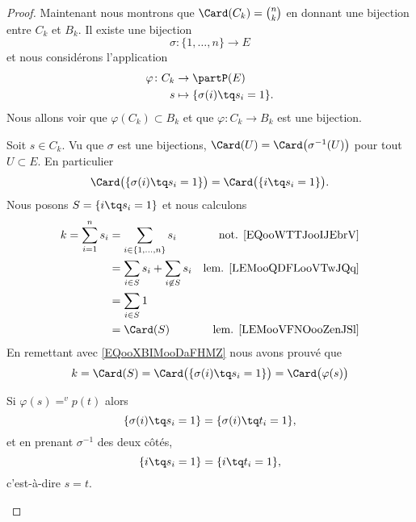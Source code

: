 \begin{proof}
	Maintenant nous montrons que \( \Card(C_k)=\binom{ n }{ k }\) en donnant une bijection entre \( C_k\) et \( B_k\). Il existe une bijection
	\begin{equation}
		\sigma \colon \{ 1,\ldots,n \}\to E
	\end{equation}
	et nous considérons l'application
	\begin{equation}
		\begin{aligned}
			\varphi\colon C_k & \to \partP(E)                     \\
			s                 & \mapsto \{ \sigma(i)\tq s_i=1 \}.
		\end{aligned}
	\end{equation}
	Nous allons voir que \( \varphi(C_k)\subset B_k\) et que \(\varphi \colon C_k\to B_k  \) est une bijection.
	\begin{subproof}
		Soit \( s\in C_k\). Vu que \( \sigma\) est une bijections, \( \Card(U)=\Card\big( \sigma^{-1}(U) \big)\) pour tout \( U\subset E\). En particulier
		\begin{equation}		\label{EQooXBIMooDaFHMZ}
			\Card\big(\{ \sigma(i)\tq s_i=1 \}\big)=\Card\big(\{ i\tq s_i=1 \}\big).
		\end{equation}
		Nous posons \( S=\{ i\tq s_i=1 \}\) et nous calculons
		\begin{subequations}		\label{SUBEQooIQKMooUfRNcK}
			\begin{align}
				k  =\sum_{i=1}^ns_i & = \sum_{i\in\{ 1,\ldots,n \}}s_i        & \text{not. \eqref{EQooWTTJooIJEbrV}} \\
				                    & = \sum_{i\in S}s_i+\sum_{i\not\in S}s_i & \text{lem. \ref{LEMooQDFLooVTwJQq}}  \\
				                    & = \sum_{i\in S}1                                                               \\
				                    & = \Card(S)                              & \text{lem. \ref{LEMooVFNOooZenJSl}}
			\end{align}
		\end{subequations}
		En remettant avec \eqref{EQooXBIMooDaFHMZ} nous avons prouvé que
		\begin{equation}
			k=\Card(S)=\Card\big( \{ \sigma(i)\tq s_i=1 \} \big)=\Card\big( \varphi(s) \big)
		\end{equation}

		Si \( \varphi(s)=^vp(t)\) alors
		\begin{equation}
			\{ \sigma(i)\tq s_i=1 \}=\{ \sigma(i)\tq t_i=1 \},
		\end{equation}
		et en prenant \( \sigma^{-1}\) des deux côtés,
		\begin{equation}
			\{ i\tq s_i=1 \}=\{ i\tq t_i=1 \},
		\end{equation}
		c'est-à-dire \( s=t\).


\end{subproof}
\end{proof}
